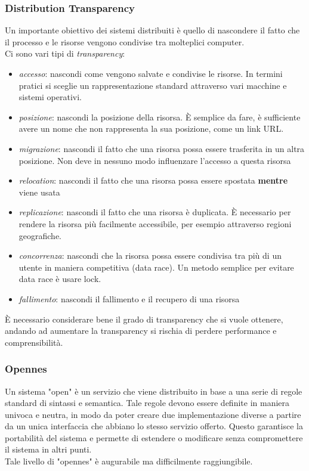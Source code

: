 \documentclass[12pt]{article}
\begin{document}
\subsubsection{Distribution Transparency}
Un importante obiettivo dei sistemi distribuiti è quello di nascondere il fatto che il processo e le risorse vengono condivise tra molteplici computer. \\
Ci sono vari tipi di \emph{transparency}:
\begin{itemize}
  \item \emph{accesso}: nascondi come vengono salvate e condivise le risorse. In termini pratici si sceglie un rappresentazione standard attraverso vari macchine e sistemi operativi.
  \item \emph{posizione}: nascondi la posizione della risorsa. È semplice da fare, è sufficiente avere un nome che non rappresenta la sua posizione, come un link URL.
  \item \emph{migrazione}: nascondi il fatto che una risorsa possa essere trasferita in un altra posizione. Non deve in nessuno modo influenzare l'accesso a questa risorsa
  \item \emph{relocation}: nascondi il fatto che una risorsa possa essere spostata \textbf{mentre} viene usata
  \item \emph{replicazione}: nascondi il fatto che una risorsa è duplicata. È necessario per rendere la risorsa più facilmente accessibile, per esempio attraverso regioni geografiche.
  \item \emph{concorrenza}: nascondi che la risorsa possa essere condivisa tra più di un utente in maniera competitiva (data race). Un metodo semplice per evitare data race è usare lock.
  \item \emph{fallimento}: nascondi il fallimento e il recupero di una risorsa 
\end{itemize}
È necessario considerare bene il grado di transparency che si vuole ottenere, andando ad aumentare la transparency si rischia di perdere performance e comprensibilità.


\newpage
\subsubsection{Opennes}
Un sistema "open" è un servizio che viene distribuito in base a una serie di regole standard di sintassi e semantica. 
Tale regole devono essere definite in maniera univoca e neutra, in modo da poter creare due implementazione diverse a partire da un unica interfaccia che abbiano lo stesso servizio offerto. 
Questo garantisce la portabilità del sistema e permette di estendere o modificare senza compromettere il sistema in altri punti.
\\ Tale livello di "opennes" è augurabile ma difficilmente raggiungibile.
\end{document}
